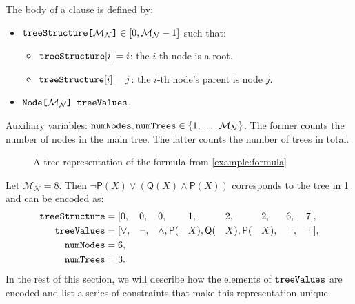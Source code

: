 \documentclass[runningheads]{llncs}
\newcommand{\variable}[1]{\texttt{\textup{#1}}}
\newcommand{\arrayd}[3]{\variable{{#1}[}{#2}\variable{]} \in {#3}}
\newcommand{\arrayt}[3]{\variable{{#3}[}{#2}\variable{] {#1}}}
\newcommand{\maxNumNodes}{\mathcal{M}_{\mathcal{N}}}
\begin{document}
\begin{definition}
  The body of a clause is defined by:
  \begin{itemize}
  \item $\arrayd{treeStructure}{\maxNumNodes{}}{[0, \maxNumNodes{} - 1]}$ such
    that:
    \begin{itemize}
    \item $\variable{treeStructure}[i] = i$: the $i$-th node is a root.
    \item $\variable{treeStructure}[i] = j$: the $i$-th node's parent is node $j$.
    \end{itemize}
  \item $\arrayt{treeValues}{\maxNumNodes{}}{Node}$.
  \end{itemize}
\end{definition}

Auxiliary variables: $\variable{numNodes}, \variable{numTrees} \in \{ 1, \dots,
\maxNumNodes{} \}$. The former counts the number of nodes in the main tree. The
latter counts the number of trees in total.

\begin{figure}[t]
  \centering
  \caption{A tree representation of the formula from \cref{example:formula}}
  \label{fig:example_tree}
\end{figure}

\begin{example} \label{example:formula}
  Let $\maxNumNodes{} = 8$. Then $\neg\mathsf{P}(X) \lor (\mathsf{Q}(X)
  \land \mathsf{P}(X))$ corresponds to the tree in \cref{fig:example_tree} and
  can be encoded as:
  \begin{alignat*}{8}
    \variable{treeStructure} &= [0, &&0, &&0, &&1, &&2, &&2, &&6, &&7],\\
    \variable{treeValues} &= [{\lor}, &&{\neg}, &&{\land}, \mathsf{P}(&&X), \mathsf{Q}(&&X), \mathsf{P}(&&X), &&\top, &&\top],\\
    \variable{numNodes} &= 6, && && && && && && &&\\
    \variable{numTrees} &= 3. && && && && && && &&
  \end{alignat*}
  In the rest of this section, we will describe how the elements of
  $\variable{treeValues}$ are encoded and list a series of constraints that make
  this representation unique.
\end{example}
\end{document}
